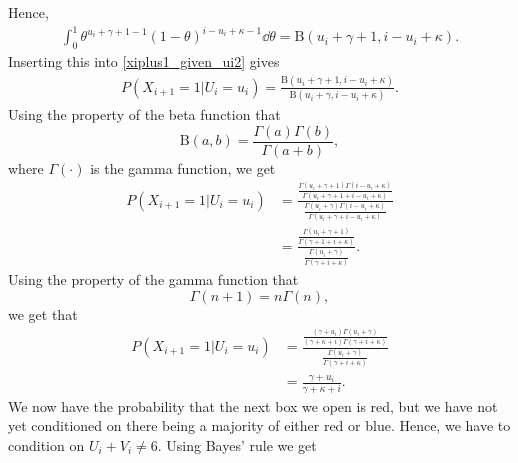 Hence,
\begin{equation*}
    \begin{aligned}
        \int_0^1 \theta^{u_i+\gamma+1-1}(1-\theta)^{i-u_i+\kappa-1} \dd \theta = \text{B}(u_i+\gamma+1,i-u_i+\kappa).
    \end{aligned}
\end{equation*}
Inserting this into \eqref{xiplus1_given_ui2} gives
\begin{equation*}
    \begin{aligned}
        P(X_{i+1}=1|U_i=u_i) 
        = \frac{\text{B}(u_i+\gamma+1,i-u_i+\kappa)}
        {\text{B}(u_i+\gamma,i-u_i+\kappa)}.
    \end{aligned}
\end{equation*}
Using the property of the beta function that
\begin{equation*}
    \text{B}(a,b) = \frac{\Gamma(a)\Gamma(b)}{\Gamma(a+b)},
\end{equation*}
where $\Gamma(\cdot)$ is the gamma function, we get
\begin{equation*}
    \begin{aligned}
        P(X_{i+1}=1|U_i=u_i) 
        &= \frac{\frac{\Gamma(u_i+\gamma+1)\Gamma(i-u_i+\kappa)}{\Gamma(u_i+\gamma+1+i-u_i+\kappa)}}
        {\frac{\Gamma(u_i+\gamma)\Gamma(i-u_i+\kappa)}{\Gamma(u_i+\gamma+i-u_i+\kappa)}} \\[6pt]
        &= \frac{\frac{\Gamma(u_i+\gamma+1)}{\Gamma(\gamma+1+i+\kappa)}}
        {\frac{\Gamma(u_i+\gamma)}{\Gamma(\gamma+i+\kappa)}}.
    \end{aligned}
\end{equation*}
Using the property of the gamma function that
\begin{equation*}
    \Gamma(n+1) = n\Gamma(n),
\end{equation*}
we get that 
\begin{equation}
\label{xiplus1_given_ui3}
    \begin{aligned}
        P(X_{i+1}=1|U_i=u_i) 
        &= \frac{\frac{(\gamma+u_i)\Gamma(u_i+\gamma)}{(\gamma+\kappa+i)\Gamma(\gamma+i+\kappa)}}
        {\frac{\Gamma(u_i+\gamma)}{\Gamma(\gamma+i+\kappa)}}\\[6pt]
        &=\frac{\gamma+u_i}
        {\gamma+\kappa+i}.
    \end{aligned}
\end{equation}
We now have the probability that the next box we open is red, but we have not yet conditioned on there being a majority of either red or blue. Hence, we have to condition on $U_i+V_i\neq6$. Using Bayes' rule we get
